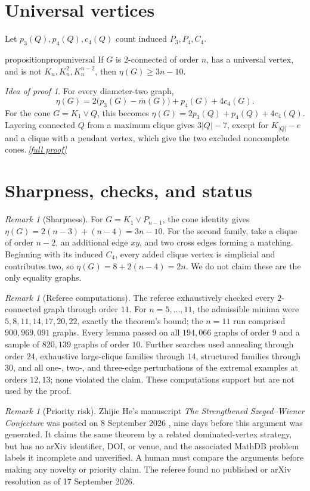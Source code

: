 \documentclass[11pt,a4paper]{article}
\theoremstyle{plain}
\theoremstyle{definition}
\theoremstyle{remark}
\newtheorem{remark}[theorem]{Remark}
\newtheorem*{proofidea}{Idea of proof}
\newcommand{\fullproofref}[1]{\,\hyperref[#1]{\textit{[full proof]}}}
\begin{document}
\section{Universal vertices}
Let $p_3(Q),p_4(Q),c_4(Q)$ count induced $P_3,P_4,C_4$.
\begin{restatable}{proposition}{propuniversal}\label{prop:universal}
If $G$ is $2$-connected of order $n$, has a universal vertex, and is not
$K_n,K_n^2,K_n^{n-2}$, then $\eta(G)\ge3n-10$.
\end{restatable}
\begin{proofidea}
For every diameter-two graph,
\[
 \eta(G)=2\bigl(p_3(G)-\overline m(G)\bigr)+p_4(G)+4c_4(G).
\]
For the cone $G=K_1\vee Q$, this becomes
$\eta(G)=2p_3(Q)+p_4(Q)+4c_4(Q)$. Layering connected $Q$ from a maximum
clique gives $3|Q|-7$, except for $K_{|Q|}-e$ and a clique with a pendant
vertex, which give the two excluded noncomplete cones.\fullproofref{pf:universal}
\end{proofidea}

\section{Sharpness, checks, and status}\label{sec:sharp}
\begin{remark}[Sharpness]
For $G=K_1\vee P_{n-1}$, the cone identity gives
$\eta(G)=2(n-3)+(n-4)=3n-10$. For the second family, take a clique of
order $n-2$, an additional edge $xy$, and two cross edges forming a
matching. Beginning with its induced $C_4$, every added clique vertex is
simplicial and contributes two, so $\eta(G)=8+2(n-4)=2n$. We do not claim
these are the only equality graphs.
\end{remark}
\begin{remark}[Referee computations]
The referee exhaustively checked every $2$-connected graph through order
$11$. For $n=5,\ldots,11$, the admissible minima were
$5,8,11,14,17,20,22$, exactly the theorem's bound; the $n=11$ run
comprised $900{,}969{,}091$ graphs. Every lemma passed on all $194{,}066$
graphs of order $9$ and a sample of $820{,}139$ graphs of order $10$.
Further searches used annealing through order $24$, exhaustive
large-clique families through $14$, structured families through $30$,
and all one-, two-, and three-edge perturbations of the extremal examples
at orders $12,13$; none violated the claim. These computations support
but are not used by the proof.
\end{remark}
\begin{remark}[Priority risk]
Zhijie He's manuscript \emph{The Strengthened Szeged--Wiener Conjecture}
was posted on 8 September 2026 \cite{He26}, nine days before this argument
was generated. It claims the same theorem by a related dominated-vertex
strategy, but has no arXiv identifier, DOI, or venue, and the associated
MathDB problem labels it incomplete and unverified. A human must compare
the arguments before making any novelty or priority claim. The referee
found no published or arXiv resolution as of 17 September 2026.
\end{remark}
\end{document}
